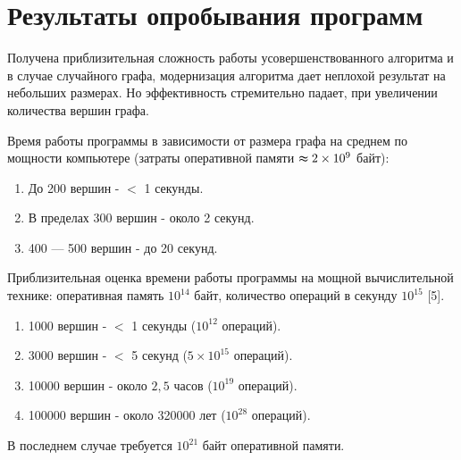 \section{Результаты опробывания программ}
\label{sec:Results_8} 
\large 


Получена приблизительная сложность работы усовершенствованного алгоритма и в случае случайного графа, модернизация алгоритма дает неплохой результат на небольших размерах. Но эффективность стремительно падает, при увеличении количества вершин графа.

Время работы программы в зависимости от размера графа на среднем по мощности компьютере (затраты оперативной памяти $\thickapprox 2\times 10^9$ байт):
\begin{enumerate}
\item  До 200 вершин - $<$ 1 секунды.
\item  В пределах 300 вершин - около 2 секунд.
\item  400 — 500 вершин - до 20 секунд.
\end{enumerate}




Приблизительная оценка времени работы программы на мощной вычислительной технике:
оперативная память $10^{14}$ байт,
количество операций в секунду $10^{15}$ [5].
\begin{enumerate}
\item 1000 вершин - $<$ 1 секунды  ($10^{12}$  операций).
\item 3000 вершин - $<$ 5 секунд ($5\times 10^{15}$ операций).
\item 10000 вершин - около $2,5$ часов ($10^{19}$ операций).
\item 100000 вершин - около 320000 лет ($10 ^{28}$ операций).
\end{enumerate}
В последнем случае требуется $10^{21}$ байт оперативной памяти.

